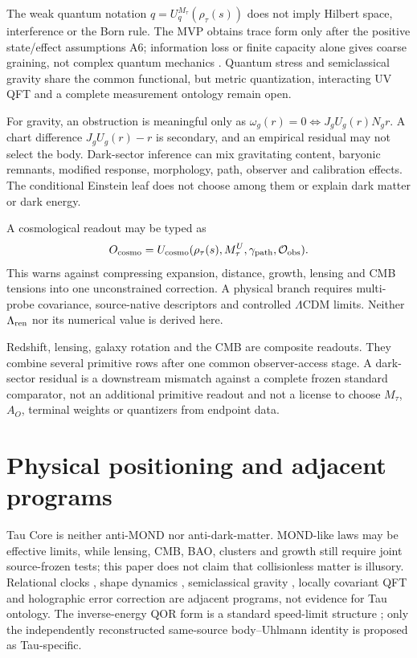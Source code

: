 \documentclass[11pt]{article}
\newcommand{\Rmap}{\rho_{\tau}}
\newcommand{\Mta}{M_{\tau}}
\begin{document}
The weak quantum notation \(q=U_q^{\Mta}(\Rmap(s))\) does not imply Hilbert
space, interference or the Born rule.  The MVP obtains trace form only after
the positive state/effect assumptions A6; information loss or finite capacity
alone gives coarse graining, not complex quantum mechanics
\cite{Hardy2001,Chiribella2011,MasanesMueller2011,BarnumWilce2014}.  Quantum
stress and semiclassical gravity share the common functional, but metric
quantization, interacting UV QFT and a complete measurement ontology remain
open.

For gravity, an obstruction is meaningful only as
\(\omega_g(r)=0\Leftrightarrow J_gU_g(r)N_gr\).  A chart difference
\(J_gU_g(r)-r\) is secondary, and an empirical residual may not select the
body.  Dark-sector inference can mix gravitating content, baryonic remnants,
modified response, morphology, path, observer and calibration effects.  The
conditional Einstein leaf does not choose among them or explain dark matter
or dark energy.

A cosmological readout may be typed as
\[
 O_{\rm cosmo}=U_{\rm cosmo}
 (\Rmap(s),\Mta^U,\gamma_{\rm path},\mathcal O_{\rm obs}).
\]
This warns against compressing expansion, distance, growth, lensing and CMB
tensions into one unconstrained correction.  A physical branch requires
multi-probe covariance, source-native descriptors and controlled
\(\Lambda\)CDM limits.  Neither \(\Lambda_{\rm ren}\) nor its numerical value
is derived here.

Redshift, lensing, galaxy rotation and the CMB are composite readouts. They
combine several primitive rows after one common observer-access stage. A
dark-sector residual is a downstream mismatch against a complete frozen
standard comparator, not an additional primitive readout and not a license to
choose $M_\tau$, $A_O$, terminal weights or quantizers from endpoint data.

\section{Physical positioning and adjacent programs}

Tau Core is neither anti-MOND nor anti-dark-matter.  MOND-like laws may be
effective limits, while lensing, CMB, BAO, clusters and growth still require
joint source-frozen tests; this paper does not claim that collisionless matter
is illusory.  Relational clocks \cite{PageWootters1983,ConnesRovelli1994}, shape
dynamics \cite{GomesKoslowski2012}, semiclassical gravity
\cite{HuVerdaguer2008}, locally covariant QFT
\cite{BrunettiFredenhagenVerch2003,HollandsWald2001,HollandsWald2002} and
holographic error correction \cite{AlmheiriDongHarlow2015} are adjacent
programs, not evidence for Tau ontology.  The inverse-energy QOR form is a
standard speed-limit structure
\cite{MandelstamTamm1945,AnandanAharonov1990,Taddei2013}; only the independently
reconstructed same-source body--Uhlmann identity is proposed as Tau-specific.
\end{document}
